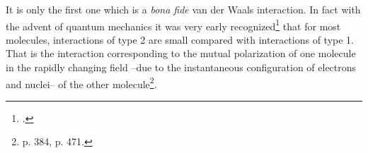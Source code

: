 \begin{subappendices}
It is only the first one which is a \textit{bona fide} van der Waals interaction. In fact with the advent of quantum mechanics it was very early  recognized\footnote{\cite{London:30}.} that for most molecules, interactions of type 2 are small compared with interactions of type 1. That is the interaction corresponding to the mutual polarization of one molecule in the rapidly changing field --due to the instantaneous configuration of electrons and nuclei-- of the other molecule\footnote{\cite{Pauling:63} p. 384, \cite{Born:69} p. 471.}.



%
%
%
%

\end{subappendices}
